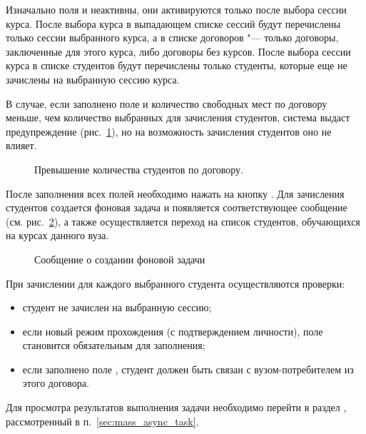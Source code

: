 Изначально поля  и  неактивны, они активируются только после выбора сессии курса.
После выбора курса в выпадающем списке сессий будут перечислены только сессии выбранного курса, 
а в списке договоров "--- только договоры, заключенные для этого курса, либо договоры без курсов.
После выбора сессии курса в списке студентов будут перечислены только студенты, 
которые еще не зачислены на выбранную сессию курса.

В случае, если заполнено поле  и количество свободных мест по договору меньше, 
чем количество выбранных для зачисления студентов, система выдаст предупреждение 
(рис.~\ref{img:student:enroll_student_error}), но на возможность зачисления студентов оно не влияет.

\begin{figure}[H]
	\caption{Превышение количества студентов по договору.}
	\label{img:student:enroll_student_error}
\end{figure}

После заполнения всех полей необходимо нажать на кнопку . Для зачисления студентов создается 
фоновая задача и появляется соответствующее сообщение (см. рис.~\ref{img:student:student_enroll_task}), 
а также осуществляется переход на список студентов, обучающихся на курсах данного вуза.
\begin{figure}[H]
	\caption{Сообщение о создании фоновой задачи}
	\label{img:student:student_enroll_task}
\end{figure}

При зачислении для каждого выбранного студента осуществляются проверки:
\begin{itemize}
	\item студент не зачислен на выбранную сессию;
	\item если новый режим прохождения  (с подтверждением личности), поле  
	становится обязательным для заполнения; 
	\item если заполнено поле , студент должен быть связан с вузом-потребителем из этого договора.
\end{itemize}

Для просмотра результатов выполнения задачи необходимо перейти в раздел , 
рассмотренный в п.~\ref{sec:mass_async_task}.

